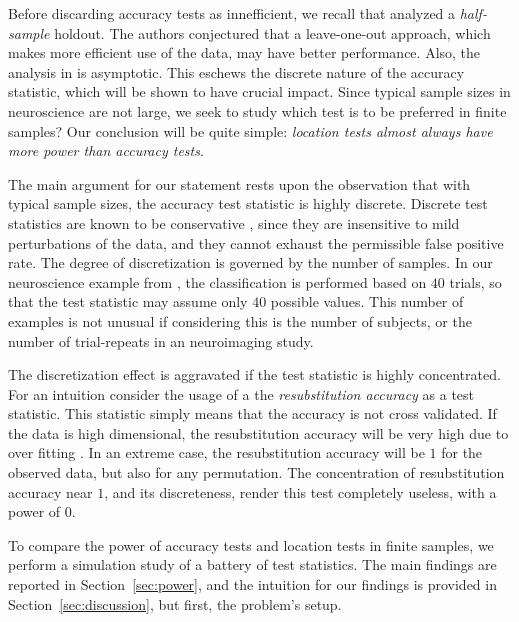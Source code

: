 \documentclass[12pt,a4paper]{article}
\begin{document}
Before discarding accuracy tests as innefficient, we recall that \cite{ramdas_classification_2016} analyzed a \emph{half-sample} holdout. 
The authors conjectured that a leave-one-out approach, which makes more efficient use of the data, may have better performance. 
Also, the analysis in \cite{ramdas_classification_2016} is asymptotic. 
This eschews the discrete nature of the accuracy statistic, which will be shown to have  crucial impact. 
Since typical sample sizes in neuroscience are not large, we seek to study which test is to be preferred in finite samples? 
Our conclusion will be quite simple: {\em location tests almost always have more power than accuracy tests}.

The main argument for our statement rests upon the observation that with typical sample sizes, the accuracy test statistic is highly discrete. 
Discrete test statistics are known to be conservative \citep{hemerik_exact_2014}, since they are insensitive to mild perturbations of the data, and they cannot exhaust the permissible false positive rate. 
The degree of discretization is governed by the number of samples. 
In our neuroscience example from \citet{gilron_quantifying_2016}, the classification is performed based on $40$ trials, so that the test statistic may assume only $40$ possible values. 
This number of examples is not unusual if considering this is the number of subjects, or the number of trial-repeats in an neuroimaging study. 

The discretization effect is aggravated if the test statistic is highly concentrated. 
For an intuition consider the usage of a the \emph{resubstitution accuracy} as a test statistic. 
This statistic simply means that the accuracy is not cross validated. 
If the data is high dimensional, the resubstitution accuracy will be very high due to over fitting \cite[Thorem 1]{mclachlan_bias_1976}. 
In an extreme case, the resubstitution accuracy will be $1$ for the observed data, but also for any permutation.
The concentration of resubstitution accuracy near $1$, and its discreteness, render this test completely useless, with a power of $0$. 


To compare the power of accuracy tests and location tests in finite samples, we perform a simulation study of a battery of test statistics. 
The main findings are reported in Section~\ref{sec:power}, and the intuition for our findings is provided in Section~\ref{sec:discussion}, but first, the problem's setup. 
\end{document}

